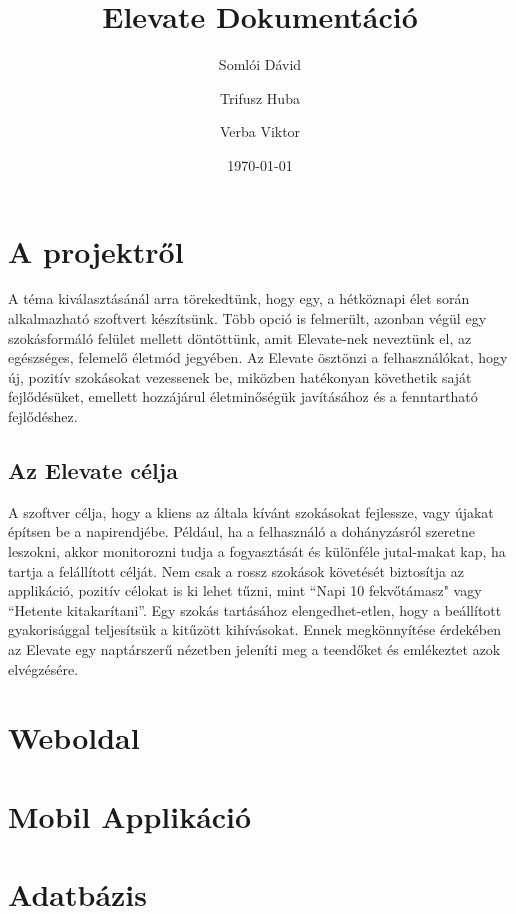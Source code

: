 \documentclass[12pt]{report}
\begin{document}
\title{Elevate Dokumentáció}
\author{Somlói Dávid
        \and
        Trifusz Huba
        \and
        Verba Viktor}
\date{\today}

\maketitle

\setcounter{tocdepth}{3}
\tableofcontents

\chapter{A projektről}
\begin{sloppypar}
A téma kiválasztásánál arra törekedtünk, hogy egy, a hétköznapi élet során alkalmazható szoftvert készítsünk. Több opció is felmerült, azonban végül egy szokásformáló felület mellett döntöttünk, amit Elevate-nek neveztünk el, az egészséges, felemelő életmód jegyében. Az Elevate ösztönzi a felhasználókat, hogy új, pozitív szokásokat vezessenek be, miközben hatékonyan követhetik saját fejlődésüket, emellett hozzájárul életminőségük javításához és a fenntartható fejlődéshez.
\end{sloppypar}
\section{Az Elevate célja}
\begin{sloppypar}
A szoftver célja, hogy a kliens az általa kívánt szokásokat fejlessze, vagy újakat építsen be a napirendjébe. Például, ha a felhasználó a dohányzásról szeretne leszokni, akkor monitorozni tudja a fogyasztását és különféle jutal-makat kap, ha tartja a felállított célját. Nem csak a rossz szokások követését biztosítja az applikáció, pozitív célokat is ki lehet tűzni, mint “Napi 10 fekvőtámasz" vagy “Hetente kitakarítani”. Egy szokás tartásához elengedhet-etlen, hogy a beállított gyakorisággal teljesítsük a kitűzött kihívásokat. Ennek megkönnyítése érdekében az Elevate egy naptárszerű nézetben jeleníti meg a teendőket és emlékeztet azok elvégzésére. 
\end{sloppypar}
\chapter{Weboldal}
\chapter{Mobil Applikáció}
\chapter{Adatbázis}
\end{document}
